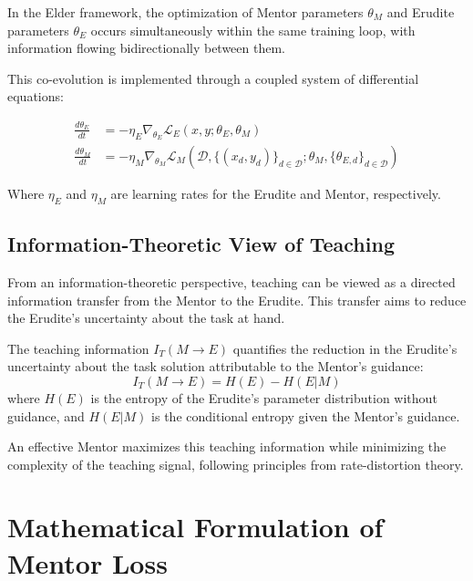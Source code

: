 \begin{proposition}
In the Elder framework, the optimization of Mentor parameters $\theta_M$ and Erudite parameters $\theta_E$ occurs simultaneously within the same training loop, with information flowing bidirectionally between them.
\end{proposition}

This co-evolution is implemented through a coupled system of differential equations:

\begin{equation}
\begin{aligned}
\frac{d\theta_E}{dt} &= -\eta_E \nabla_{\theta_E} \mathcal{L}_E(x, y; \theta_E, \theta_M) \\
\frac{d\theta_M}{dt} &= -\eta_M \nabla_{\theta_M} \mathcal{L}_M(\mathcal{D}, \{(x_d, y_d)\}_{d \in \mathcal{D}}; \theta_M, \{\theta_{E,d}\}_{d \in \mathcal{D}})
\end{aligned}
\end{equation}

Where $\eta_E$ and $\eta_M$ are learning rates for the Erudite and Mentor, respectively.

\subsection{Information-Theoretic View of Teaching}

From an information-theoretic perspective, teaching can be viewed as a directed information transfer from the Mentor to the Erudite. This transfer aims to reduce the Erudite's uncertainty about the task at hand.

\begin{definition}
The teaching information $I_T(M \rightarrow E)$ quantifies the reduction in the Erudite's uncertainty about the task solution attributable to the Mentor's guidance:
\begin{equation}
I_T(M \rightarrow E) = H(E) - H(E|M)
\end{equation}
where $H(E)$ is the entropy of the Erudite's parameter distribution without guidance, and $H(E|M)$ is the conditional entropy given the Mentor's guidance.
\end{definition}

An effective Mentor maximizes this teaching information while minimizing the complexity of the teaching signal, following principles from rate-distortion theory.

\section{Mathematical Formulation of Mentor Loss}

